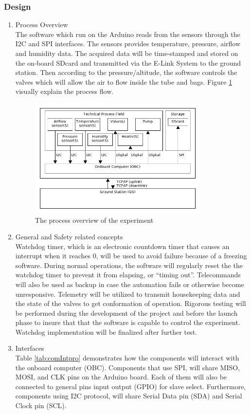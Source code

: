 \subsubsection{Design}
\begin{enumerate}[label=(\alph*)]
\item{Process Overview}\\
The software which run on the Arduino reads from the sensors through the I2C and SPI interfaces. The sensors provides temperature, pressure, airflow and humidity data. The acquired data will be time-stamped and stored on the on-board SDcard and transmitted via the E-Link System to the ground station. Then according to the pressure/altitude, the software controls the valves which will allow the air to flow inside the tube and bags. Figure \ref{processOverview} visually explain the process flow.
\begin{figure}[H]
    \centering
    \includegraphics[width=0.85\textwidth]{4-experiment-design/img/Process-overview-V0-1.png}
    \caption{The process overview of the experiment}
    \label{processOverview}
\end{figure}
\item{General and Safety related concepts}\\
Watchdog timer, which is an electronic countdown timer that causes an interrupt when it reaches 0, will be used to avoid failure because of a freezing software. During normal operations, the software will regularly reset the the watchdog timer to prevent it from elapsing, or \enquote{timing out}. Telecommands will also be used as backup in case the automation fails or otherwise become unresponsive. Telemetry will be utilized to transmit housekeeping data and the state of the valves to get conformation of operation. Rigorous testing will be performed during the development of the project and before the launch phase to insure that that the software is capable to control the experiment. Watchdog implementation will be finalized after further test.
\item{Interfaces}\\
Table \ref{tab:comIntpro} demonstrates how the components will interact with the onboard computer (OBC). Components that use SPI, will share MISO, MOSI, and CLK pins on the Arduino board. Each of them will also be connected to general pins input output (GPIO) for slave select. Furthermore, components using I2C protocol, will share Serial Data pin (SDA) and Serial Clock pin (SCL).


\end{enumerate}
